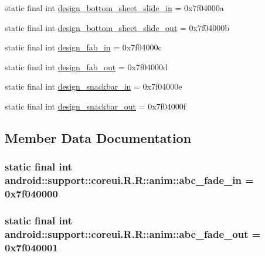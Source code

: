 \begin{CompactItemize}
\item 
static final int \hyperlink{classandroid_1_1support_1_1coreui_1_1_r_1_1anim_fed297596452f1dde9b33b120141953a}{design\_\-bottom\_\-sheet\_\-slide\_\-in} = 0x7f04000a
\item 
static final int \hyperlink{classandroid_1_1support_1_1coreui_1_1_r_1_1anim_16d060ded6d3d692030b2e31b5fa6cd8}{design\_\-bottom\_\-sheet\_\-slide\_\-out} = 0x7f04000b
\item 
static final int \hyperlink{classandroid_1_1support_1_1coreui_1_1_r_1_1anim_ba714aa0a6c22310402638daf50f9f71}{design\_\-fab\_\-in} = 0x7f04000c
\item 
static final int \hyperlink{classandroid_1_1support_1_1coreui_1_1_r_1_1anim_11ae41e80f58e6d63adf68441f88cf53}{design\_\-fab\_\-out} = 0x7f04000d
\item 
static final int \hyperlink{classandroid_1_1support_1_1coreui_1_1_r_1_1anim_5d5a3da042ea0f73c7ad25db8f18b002}{design\_\-snackbar\_\-in} = 0x7f04000e
\item 
static final int \hyperlink{classandroid_1_1support_1_1coreui_1_1_r_1_1anim_8cca191dc6185f5e4ac60e63625995a6}{design\_\-snackbar\_\-out} = 0x7f04000f
\end{CompactItemize}


\subsection{Member Data Documentation}
\hypertarget{classandroid_1_1support_1_1coreui_1_1_r_1_1anim_8d22f59ae7899a7ec6f9bb42cff54e8c}{
\subsubsection[{abc\_\-fade\_\-in}]{\setlength{\rightskip}{0pt plus 5cm}static final int android::support::coreui.R.R::anim::abc\_\-fade\_\-in = 0x7f040000}}
\label{classandroid_1_1support_1_1coreui_1_1_r_1_1anim_8d22f59ae7899a7ec6f9bb42cff54e8c}


\hypertarget{classandroid_1_1support_1_1coreui_1_1_r_1_1anim_cafd5b08f6747324718318a83f6fd1f4}{
\subsubsection[{abc\_\-fade\_\-out}]{\setlength{\rightskip}{0pt plus 5cm}static final int android::support::coreui.R.R::anim::abc\_\-fade\_\-out = 0x7f040001}}
\label{classandroid_1_1support_1_1coreui_1_1_r_1_1anim_cafd5b08f6747324718318a83f6fd1f4}



